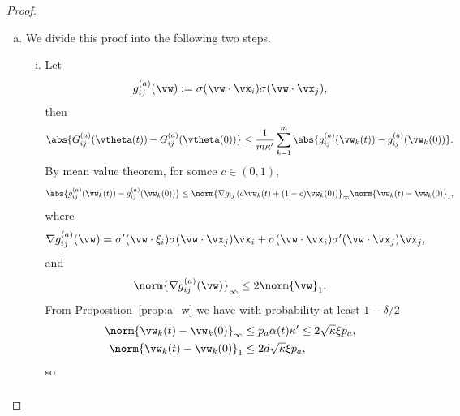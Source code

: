 \documentclass{article}
\begin{document}
\begin{proof}
\begin{enumerate}[(a)]
        \item We divide this proof into the following two steps.
              \begin{enumerate}[(i)]
                  \item Let
                        \begin{equation}
                            g^{(a)}_{ij}(\vw) := \sigma(\vw\cdot\vx_i)\sigma(\vw\cdot\vx_j),
                        \end{equation}
                        then
                        \begin{equation}
                            \abs{G_{ij}^{(a)}(\vtheta(t)) - G_{ij}^{(a)}(\vtheta(0))} \leq \frac{1}{m\kappa'}\sum_{k=1}^m \abs{g^{(a)}_{ij}(\vw_k(t)) - g^{(a)}_{ij}(\vw_k(0))}.
                        \end{equation}
                        By mean value theorem, for somce $c\in(0,1)$,
                        \begin{equation}
                            \abs{g^{(a)}_{ij}(\vw_k(t)) - g^{(a)}_{ij}(\vw_k(0))} \leq \norm{\nabla g_{ij}\left(c\vw_k(t) + (1-c)\vw_k(0)\right)}_{\infty}\norm{\vw_k(t) - \vw_k(0)}_1,
                        \end{equation}
                        where
                        \begin{equation}
                            \nabla g_{ij}^{(a)}(\vw)=\sigma'(\vw\cdot\xi_i)\sigma(\vw\cdot\vx_j)\vx_i+\sigma(\vw\cdot\vx_i)\sigma'(\vw\cdot\vx_j)\vx_j,
                        \end{equation}
                        and
                        \begin{equation}
                            \norm{\nabla g_{ij}^{(a)}(\vw)}_{\infty}\leq 2\norm{\vw}_1.
                        \end{equation}
                        From Proposition~\ref{prop:a_w} we have with probability at least $1-\delta/2$
                        \begin{align}
                            \norm{\vw_k(t)-\vw_k(0)}_{\infty} & \leq p_a\alpha(t)\kappa'\leq 2\sqrt{\kappa}\xi p_a, \\
                            \norm{\vw_k(t)-\vw_k(0)}_1        & \leq 2d\sqrt{\kappa}\xi p_a,
                        \end{align}
                        so
                        \begin{equation}
                            \begin{aligned}

\end{aligned}
\end{equation}
\end{enumerate}
\end{enumerate}
\end{proof}
\end{document}
